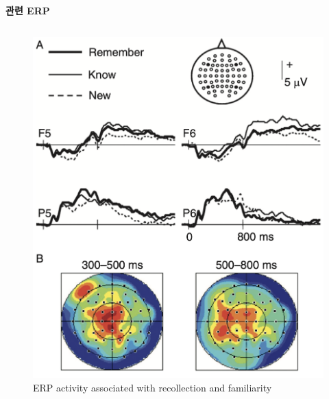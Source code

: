 \documentclass{beamer}
\begin{document}
\begin{frame}{\textbf{관련 ERP}}
\begin{columns}
\begin{column}{0.48\textwidth}
\begin{figure}
        \includegraphics[width=\textwidth]{image/familiarity_ERP}
        \caption{ERP activity associated with recollection and familiarity}
      \end{figure}
    \end{column}
  \end{columns}
\end{frame}
\end{document}
